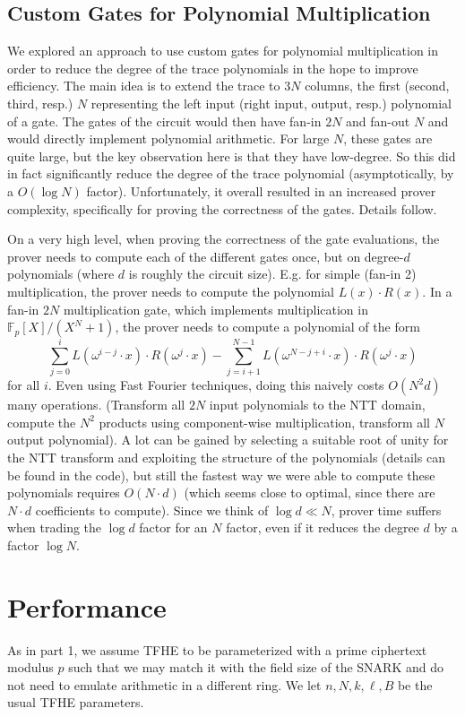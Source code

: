 \documentclass{zamarep}
\newcommand{\field}{\mathbb{F}}
\begin{document}
\subsection{Custom Gates for Polynomial Multiplication}
\label{sec:custom}
We explored an approach to use custom gates for polynomial multiplication in order to reduce the degree of the trace polynomials in the hope to improve efficiency. The main idea is to extend the trace to $3N$ columns, the first (second, third, resp.) $N$ representing the left input (right input, output, resp.) polynomial of a gate. The gates of the circuit would then have fan-in $2N$ and fan-out $N$ and would directly implement polynomial arithmetic. For large $N$, these gates are quite large, but the key observation here is that they have low-degree. So this did in fact significantly reduce the degree of the trace polynomial (asymptotically, by a $O(\log N)$ factor). Unfortunately, it overall resulted in an increased prover complexity, specifically for proving the correctness of the gates. Details follow.

On a very high level, when proving the correctness of the gate evaluations, the prover needs to compute each of the different gates once, but on degree-$d$ polynomials (where $d$ is roughly the circuit size). E.g. for simple (fan-in 2) multiplication, the prover needs to compute the polynomial $L(x) \cdot R(x)$. In a fan-in $2N$ multiplication gate, which implements multiplication in $\field_p[X]/(X^N + 1)$, the prover needs to compute a polynomial of the form
$$\sum_{j=0}^iL(\omega^{i-j}\cdot x) \cdot R(\omega^j \cdot x) - \sum_{j=i+1}^{N-1}L(\omega^{N-j+i}\cdot x) \cdot R(\omega^j \cdot x) $$
for all $i$. Even using Fast Fourier techniques, doing this naively costs $O(N^2 d)$ many operations. (Transform all $2N$ input polynomials to the NTT domain, compute the $ N^2$ products using component-wise multiplication, transform all $N$ output polynomial). A lot can be gained by selecting a suitable root of unity for the NTT transform and exploiting the structure of the polynomials (details can be found in the code), but still the fastest way we were able to compute these polynomials requires $O(N \cdot d)$ (which seems close to optimal, since there are $N \cdot d$ coefficients to compute). Since we think of $\log d \ll N$, prover time suffers when trading the $\log d$ factor for an $N$ factor, even if it reduces the degree $d$ by a factor $\log N$.

\section{Performance}
\label{sec:perf}
As in part 1, we assume TFHE to be parameterized with a prime ciphertext modulus $p$ such that we may match it with the field size of the SNARK and do not need to emulate arithmetic in a different ring. We let $n, N, k, \ell, B$ be the usual TFHE parameters. 
\end{document}
